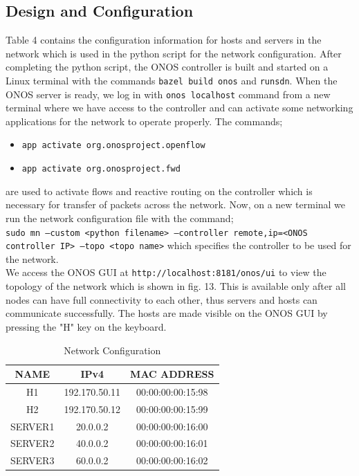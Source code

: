 \documentclass{article}
\begin{document}
\subsection{Design and Configuration}
Table 4 contains the configuration information for hosts and servers in the network which is used in the python script for the network configuration. After completing the python script, the ONOS controller is built and started on a Linux terminal with the commands \texttt{bazel build onos} and \texttt{runsdn}. When the ONOS server is ready, we log in with \texttt{onos localhost} command from a new terminal where we have access to the controller and can activate some networking applications for the network to operate properly. The commands;
	\begin{itemize}
		\item \texttt{app activate org.onosproject.openflow}
		\item \texttt{app activate org.onosproject.fwd}
	\end{itemize}
are used to activate flows and reactive routing on the controller which is necessary for transfer of packets across the network. Now, on a new terminal we run the network configuration file with the command; \\ \texttt{sudo mn --custom <python filename> --controller remote,ip=<ONOS controller IP> --topo <topo name>} which specifies the controller to be used for the network. \\ We access the ONOS GUI at \texttt{http://localhost:8181/onos/ui} to view the topology of the network which is shown in fig. 13. This is available only after all nodes can have full connectivity to each other, thus servers and hosts can communicate successfully. The hosts are made visible on the ONOS GUI by pressing the "H" key on the keyboard.
    	\begin{table}[h]
        		\centering
        		\begin{tabular}{|c|c|c|}
            		\hline
            		NAME & IPv4 & MAC ADDRESS \\
            		\hline
            		H1 & 192.170.50.11 & 00:00:00:00:15:98 \\
           		H2 & 192.170.50.12 & 00:00:00:00:15:99 \\
            		SERVER1 & 20.0.0.2 & 00:00:00:00:16:00 \\
            		SERVER2 & 40.0.0.2 & 00:00:00:00:16:01 \\
            		SERVER3 & 60.0.0.2 & 00:00:00:00:16:02 \\
            		\hline
        		\end{tabular}
        		\caption{Network Configuration}
        		\label{tab:4}
    	\end{table}
\end{document}
